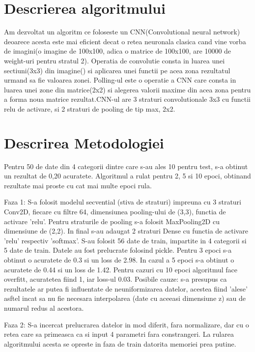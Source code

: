 \documentclass[a4papaer,12pt]{article}
\begin{document}
\section{Descrierea algoritmului}
Am dezvoltat un algoritm ce foloseste un CNN(Convolutional neural network) deoarece acesta este mai eficient decat o retea neuronala clasica cand vine vorba de imagini(o imagine de 100x100, adica o matrice de 100x100, are 10000 de weight-uri pentru stratul 2). Operatia de convolutie consta in luarea unei sectiuni(3x3) din imagine() si aplicarea unei functii pe acea zona rezultatul urmand sa fie valoarea zonei. Polling-ul este o operatie a CNN care consta in luarea unei zone din matrice(2x2) si alegerea valorii maxime din acea zona pentru a forma noua matrice rezultat.CNN-ul are 3 straturi convolutionale 3x3 cu functii relu de activare, si 2 straturi de pooling de tip max, 2x2. 

\section{Descrirea Metodologiei}
Pentru 50 de date din 4 categorii dintre care s-au ales 10 pentru test, s-a obtinut un rezultat de 0,20 acuratete. Algoritmul a rulat pentru 2, 5 si 10 epoci, obtinand rezultate mai proste cu cat mai multe epoci rula.

Faza 1:
S-a folosit modelul secvential (stiva de straturi) impreuna cu 3 straturi Conv2D, fiecare cu filtre 64, dimensiunea pooling-ului de (3,3), functia de activare 'relu'. Pentru straturile de pooling s-a folosit MaxPooling2D cu dimensiune de (2,2). In final s-au adaugat 2 straturi Dense cu functia de activare 'relu' respectiv 'softmax'. 
S-au folosit 56 date de train, impartite in 4 categorii si 5 date de train. Datele au fost prelucrate folosind pickle. Pentru 3 epoci s-a obtinut o acuratete de 0.3 si un loss de 2.98. In cazul a 5 epoci s-a obtinut o acuratete de 0.44 si un loss de 1.42. Pentru cazuri cu 10 epoci algoritmul face overfitt, acuratetea fiind 1, iar loss-ul 0.03.
Posibile cauze: s-a presupus ca rezultatele ar putea fi influentate de neuniformizarea datelor, acestea fiind 'alese' asftel incat sa nu fie necesara interpolarea (date cu aceeasi dimensiune z) sau de numarul redus al acestora. 

Faza 2:
S-a incercat prelucrarea datelor in mod diferit, fara normalizare, dar cu o retea care sa primeasca ca si input 4 parametri fara constrangeri. La rularea algoritmului acesta se opreste in faza de train datorita memoriei prea putine.
\end{document}

